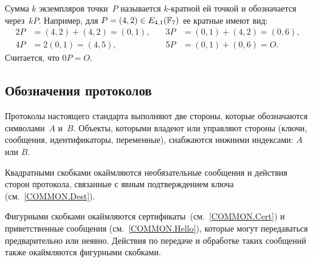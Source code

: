 Сумма $k$ экземпляров точки~$P$ называется $k$-кратной ей точкой 
и обозначается через~$kP$.
Например, для $P=(4,2)\in E_{4,1}(\mathbb{F}_7)$ ее кратные имеют вид:
\begin{align*}
2P&=(4,2)+(4,2)=(0,1),\quad
&3P&=(0,1)+(4,2)=(0,6),\\
4P&=2(0,1)=(4,5),\quad
&5P&=(0,1)+(0,6)=O.
\end{align*}
Считается, что $0P=O$.

\subsection{Обозначения протоколов}

Протоколы настоящего стандарта выполняют две стороны,
которые обозначаются символами~$A$ и~$B$.
%
%
Объекты, которыми владеют или управляют стороны 
(ключи, сообщения, идентификаторы, переменные),
снабжаются нижними индексами: $A$ или $B$.

Квадратными скобками окаймляются 
необязательные сообщения и действия сторон протокола, 
связанные с явным подтверждением ключа (см.~\ref{COMMON.Dest}).

Фигурными скобками окаймляются сертификаты~(см.~\ref{COMMON.Cert})
и приветственные сообщения (см.~\ref{COMMON.Hello}),
которые могут передаваться предварительно или неявно. 
Действия по передаче и обработке таких сообщений
также окаймляются фигурными скобками.





